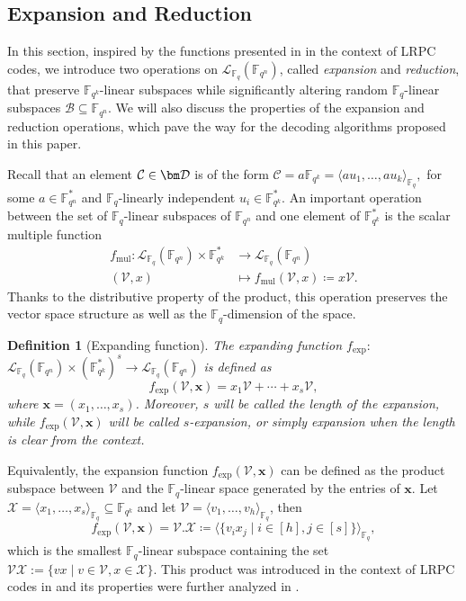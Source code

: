 \documentclass{article}
\newtheorem{definition}{Definition}
\newcommand{\Fq}{\mathbb{F}_{q}}
\newcommand{\Fqn}{\mathbb{F}_{q^n}}
\newcommand{\Fqk}{\mathbb{F}_{q^k}}
\newcommand{\calB}{\mathcal{B}}
\newcommand{\calC}{\mathcal{C}}
\newcommand{\calD}{\mathcal{D}}
\newcommand{\calL}{\mathcal{L}}
\newcommand{\calV}{\mathcal{V}}
\newcommand{\calX}{\mathcal{X}}
\newcommand{\fexp}{f_{\mathrm{exp}}}
\newcommand{\fmul}{f_{\mathrm{mul}}}
\newcommand{\Span}[2]{\langle #2 \rangle_{#1}}
\begin{document}
\subsection{Expansion and Reduction}
\label{sec:exp_and_red}
In this section, inspired by the functions presented in \cite{Aragon19} in the context of LRPC codes, we introduce two operations on $\calL_{\Fq}(\Fqn)$, called \textit{expansion} and \textit{reduction}, that preserve $\Fqk$-linear subspaces while significantly altering random $\Fq$-linear subspaces $\calB \subseteq \Fqn$.
We will also discuss the properties of the expansion and reduction operations, which pave the way for the decoding algorithms proposed in this paper.
\\
\par Recall that an element $\calC \in \bm \calD$ is of the form $\calC = a \Fqk=\Span{\Fq}{au_1, \ldots, au_k},$ for some $a \in \Fqn^*$ and $\Fq$-linearly independent $u_i\in\Fqk^*$. 
An important operation between the set of $\Fq$-linear subspaces of $\Fqn$ and one element of $\Fqk^*$ is the scalar multiple function 
\begin{align*}
    \fmul\colon \calL_{\Fq}(\Fqn) \times \Fqk^* &\rightarrow \calL_{\Fq}(\Fqn)\\
    (\calV,x)&\mapsto\fmul(\calV,x) \coloneqq x \calV.
\end{align*}
Thanks to the distributive property of the product, this operation preserves the vector space structure as well as the $\Fq$-dimension of the space.
\begin{definition}[{Expanding function}]
The expanding function $\fexp:\,$
$
\calL_{\Fq}(\Fqn) \times (\Fqk^*)^s 
\rightarrow \calL_{\Fq}(\Fqn) $ is defined
as $$\fexp(\calV, \bm x)=x_1 \calV + \cdots + x_s \calV,$$
where $\bm x=(x_1,\ldots,x_s)$. Moreover, $s$ will be called the length of the expansion, while $\fexp(\calV, \bm x)$ will be called $s$-expansion, or simply expansion when the length is clear from the context.
\end{definition}
Equivalently, the expansion function $\fexp(\calV, \bm x)$ can be defined as the product subspace between $\calV$ and the $\Fq$-linear space generated by the entries of $\bm x$.
Let $\calX = \Span{\Fq}{x_1,\ldots,x_s} \subseteq \Fqk$ and let $\calV = \Span{\Fq}{v_1, \dots, v_{h}}$, then
$$
    \fexp(\calV,\bm x) = \calV.\calX \coloneqq \Span{\Fq}{\{v_i x_j \mid i \in [h], j \in [s]\}},
$$
which is the smallest $\Fq$-linear subspace containing the set $\calV \calX := \{ vx \mid v \in \calV, x \in \calX\}.$ This product was introduced in the context of LRPC codes in \cite{gaborit2013} and its properties were further analyzed in \cite{Aragon19}. 
\end{document}
